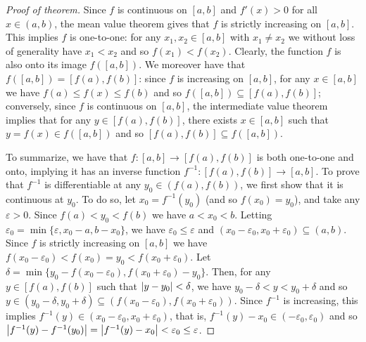 \documentclass[12 pt,letterpaper]{article}
\newcommand{\set}[1]{\{{#1}\}}
\begin{document}
\begin{proof}[Proof of theorem]
Since $f$ is continuous on $[a,b]$ and $f'(x)>0$ for all $x\in(a,b)$,
the mean value theorem gives that $f$ is strictly increasing on $[a,b]$.
This implies $f$ is one-to-one: for any $x_1,x_2\in[a,b]$ with $x_1\neq x_2$ we without loss of generality have $x_1<x_2$ and so $f(x_1)<f(x_2)$.
Clearly, the function $f$ is also onto its image $f([a,b])$.
We moreover have that $f([a,b])=[f(a),f(b)]$:
since $f$ is increasing on $[a,b]$, for any $x\in[a,b]$ we have $f(a)\leq f(x)\leq f(b)$ and so
$f([a,b])\subseteq[f(a),f(b)]$;
conversely, since $f$ is continuous on $[a,b]$,
the intermediate value theorem implies that for any $y\in[f(a),f(b)]$,
there exists $x\in[a,b]$ such that $y=f(x)\in f([a,b])$ and so $[f(a),f(b)]\subseteq f([a,b])$.\medskip

\noindent
To summarize, we have that $f:[a,b]\rightarrow[f(a),f(b)]$ is both one-to-one and onto, implying it has an inverse function $f^{-1}:[f(a),f(b)]\rightarrow[a,b]$.
To prove that $f^{-1}$ is differentiable at any $y_0\in(f(a),f(b))$,
we first show that it is continuous at $y_0$.
To do so, let $x_0=f^{-1}(y_0)$ (and so $f(x_0)=y_0$),
and take any $\varepsilon>0$.
Since $f(a)<y_0<f(b)$ we have $a<x_0<b$.
Letting $\varepsilon_0=\min\set{\varepsilon,x_0-a,b-x_0}$,
we have $\varepsilon_0\leq\varepsilon$ and $(x_0-\varepsilon_0,x_0+\varepsilon_0)\subseteq(a,b)$.
Since $f$ is strictly increasing on $[a,b]$ we have $f(x_0-\varepsilon_0)<f(x_0)=y_0<f(x_0+\varepsilon_0)$.
Let $\delta=\min\set{y_0-f(x_0-\varepsilon_0),f(x_0+\varepsilon_0)-y_0}$.
Then, for any $y\in[f(a),f(b)]$ such that $\abs{y-y_0}<\delta$,
we have $y_0-\delta<y<y_0+\delta$ and so $y\in(y_0-\delta,y_0+\delta)\subseteq(f(x_0-\varepsilon_0),f(x_0+\varepsilon_0))$.
Since $f^{-1}$ is increasing, this implies $f^{-1}(y)\in(x_0-\varepsilon_0,x_0+\varepsilon_0)$,
that is, $f^{-1}(y)-x_0\in(-\varepsilon_0,\varepsilon_0)$ and so $\abs{f^{-1}(y)-f^{-1}(y_0)}=\abs{f^{-1}(y)-x_0}<\varepsilon_0\leq\varepsilon$.\medskip


\end{proof}
\end{document}
